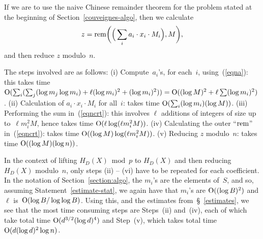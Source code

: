 \documentclass{amsart}
\newcommand{\nn}{\newline \noindent}
\newcommand{\bigo}{{\rm O}}
\newcommand{\rem}{{\rm rem}}
\newcommand{\comment}[1]{}
\theoremstyle{plain}
\begin{document}
If we are to use the naive Chinese remainder theorem for the
problem stated at the beginning of Section~\ref{couveignes-algo}, 
then we calculate 
\begin{eqnarray} \label{eqncrt}
z 
= \rem \bigg( \Big(\sum_i a_i \cdot x_i \cdot M_i \Big), M \bigg), 
\end{eqnarray}
and then reduce $z$ modulo~$n$.

The steps involved are as follows:
\nn (i) Compute~$a_i$'s, for each~$i$, using~(\ref{eqna}): 
this takes
time $\bigo(\sum_i ( \sum_j (\log m_j \log m_i) + \ell (\log m_i)^2
+ (\log m_i)^2)) = \bigo((\log M)^2 + \ell \sum (\log m_i)^2)$.
\nn (ii) Calculation of $a_i \cdot  x_i \cdot M_i$ for all~$i$: takes time 
$\bigo ( \sum_i (\log m_i)(\log M))$. 
\nn (iii) Performing the sum in~(\ref{eqncrt}): this involves $\ell$ additions
of integers of size up to~$\ell m_i^2 M$, 
hence takes time $\bigo(\ell \log(\ell m_i^2 M))$.
\nn (iv) Calculating the outer ``\mbox{$\rem$}'' in~(\ref{eqncrt}):
takes time $\bigo( (\log M) \log (\ell m_i^2 M))$.
\nn (v) Reducing $z$ modulo~$n$: takes time $\bigo((\log M)(\log n))$.

In the context of lifting $H_D(X) \bmod p$ to $H_D(X)$ and then reducing
$H_D(X)$ modulo~$n$, only steps (ii) -- (vi) have to be repeated for
each coefficient. 
In the notation of Section~\ref{section:algo}, 
the $m_i$'s are the elements of~$S$, and so, assuming
Statement~\ref{estimate-stat},
we again have that $m_i$'s are $\bigo( (\log B)^2 )$ and $\ell$ 
is~$\bigo( \log B/\log\log B )$.
Using this, and the estimates from~\S~\ref{estimates},
we see that the most time consuming steps are Steps~(ii) and~(iv), 
each of which take total time $\bigo( d^{3/2} (\log d)^4)$ 
and Step~(v), which takes total
time $\bigo( d (\log d)^2 \log n)$.

\comment{
Again in the notation of Section~\ref{section:algo}, 
$m_i=p_i$.  For the sake of comparison, again assume that $\ell$ and~$p_i$
are $\bigo( \log M)$, and $M = B$. Thus the time taken for the
calculation of step~(ii) above,
performed $h$ 
times (once for each coefficient of~$H_D(X)$), 
will dominate to give a complexity of 
$\bigo( (\log B)^2 (\log \log B) )$ to be performed $h$ times.
}
\end{document}
